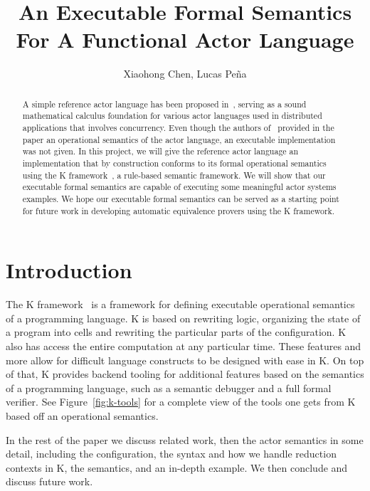 \documentclass{llncs}
\begin{document}
%
\mainmatter              %
%
\title{An Executable Formal Semantics For A Functional Actor Language}
%
\author{Xiaohong Chen, Lucas Pe\~{n}a}
%

\maketitle              %

\begin{abstract}
A simple reference actor language has been proposed in~\cite{}, serving as a
sound mathematical calculus foundation for various actor languages used in
distributed applications that involves concurrency. Even though the authors
of~\cite{} provided in the paper an operational semantics of the actor language,
an executable implementation was not given. In this project, we will give the
reference actor language an implementation that by construction conforms to its
formal operational semantics using the K framework~\cite{}, a rule-based
semantic framework. We will show that our executable formal semantics are
capable of executing some meaningful actor systems examples. We hope our
executable formal semantics can be served as a starting point for future work in
developing automatic equivalence provers using the K framework.
\end{abstract}
%
\section{Introduction}
The K framework~\cite{} is a framework for defining executable operational
semantics of a programming language. K is based on rewriting logic, organizing
the state of a program into cells and rewriting the particular parts of the
configuration. K also has access the entire computation at any particular
time. These features and more allow for difficult language constructs to be
designed with ease in K. On top of that, K provides backend tooling for
additional features based on the semantics of a programming language, such as a
semantic debugger and a full formal verifier. See Figure~\ref{fig:k-tools} for a
complete view of the tools one gets from K based off an operational semantics.

In the rest of the paper we discuss related work, then the actor semantics in
some detail, including the configuration, the syntax and how we handle reduction
contexts in K, the semantics, and an in-depth example. We then conclude and
discuss future work.
\end{document}
